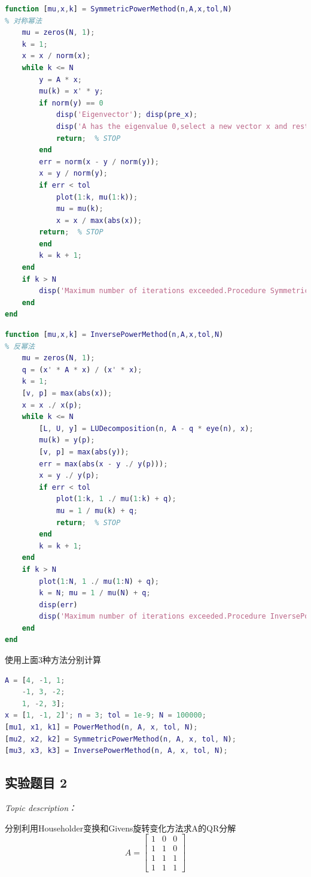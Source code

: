 \documentclass[12pt]{ctexart}
\begin{document}
\begin{lstlisting}[language = MATLAB]
function [mu,x,k] = SymmetricPowerMethod(n,A,x,tol,N)
% 对称幂法
	mu = zeros(N, 1);
	k = 1;
	x = x / norm(x);
	while k <= N
		y = A * x;
		mu(k) = x' * y;
		if norm(y) == 0
			disp('Eigenvector'); disp(pre_x);
			disp('A has the eigenvalue 0,select a new vector x and restart');
			return;  % STOP
		end
		err = norm(x - y / norm(y));
		x = y / norm(y);
		if err < tol
			plot(1:k, mu(1:k));
			mu = mu(k);
			x = x / max(abs(x));
		return;  % STOP
		end
		k = k + 1;
	end
	if k > N
		disp('Maximum number of iterations exceeded.Procedure SymmetricPowerMethod completed unsuccessfully');
	end
end
\end{lstlisting}

\begin{lstlisting}[language = MATLAB]
function [mu,x,k] = InversePowerMethod(n,A,x,tol,N)
% 反幂法
	mu = zeros(N, 1);
	q = (x' * A * x) / (x' * x);
	k = 1;
	[v, p] = max(abs(x));
	x = x ./ x(p);
	while k <= N
		[L, U, y] = LUDecomposition(n, A - q * eye(n), x);
		mu(k) = y(p);
		[v, p] = max(abs(y));
		err = max(abs(x - y ./ y(p)));
		x = y ./ y(p);
		if err < tol
			plot(1:k, 1 ./ mu(1:k) + q);
			mu = 1 / mu(k) + q;
			return;  % STOP
		end
		k = k + 1;
	end
	if k > N
		plot(1:N, 1 ./ mu(1:N) + q);
		k = N; mu = 1 / mu(N) + q;
		disp(err)
		disp('Maximum number of iterations exceeded.Procedure InversePowerMethod completed unsuccessfully');
	end
end
\end{lstlisting}
	使用上面3种方法分别计算
\begin{lstlisting}[language = MATLAB]
% 第9章 第1题
A = [4, -1, 1;
	-1, 3, -2;
	1, -2, 3];
x = [1, -1, 2]'; n = 3; tol = 1e-9; N = 100000;
[mu1, x1, k1] = PowerMethod(n, A, x, tol, N);
[mu2, x2, k2] = SymmetricPowerMethod(n, A, x, tol, N);
[mu3, x3, k3] = InversePowerMethod(n, A, x, tol, N);
\end{lstlisting}
	
	\subsection{实验题目 2}
	\textit{Topic description：}
	
	分别利用Householder变换和Givens旋转变化方法求A的QR分解
	\[
	A=\begin{bmatrix}
	1&0&0 \\
	1&1&0 \\
	1&1&1 \\
	1&1&1
	\end{bmatrix}
	\]
	
\end{document}
